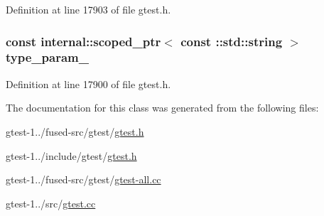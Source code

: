 \-Definition at line 17903 of file gtest.\-h.

\hypertarget{classtesting_1_1TestCase_a85fc352afd22204cc3515cb59a7d5b38}{
\subsubsection[{type\-\_\-param\-\_\-}]{\setlength{\rightskip}{0pt plus 5cm}const {\bf internal\-::scoped\-\_\-ptr}$<$ const \-::std\-::string $>$ {\bf type\-\_\-param\-\_\-}}}\label{d0/d9a/classtesting_1_1TestCase_a85fc352afd22204cc3515cb59a7d5b38}


\-Definition at line 17900 of file gtest.\-h.



\-The documentation for this class was generated from the following files\-:\begin{DoxyCompactItemize}
\item 
gtest-\/1../fused-\/src/gtest/\hyperlink{fused-src_2gtest_2gtest_8h}{gtest.\-h}\item 
gtest-\/1../include/gtest/\hyperlink{include_2gtest_2gtest_8h}{gtest.\-h}\item 
gtest-\/1../fused-\/src/gtest/\hyperlink{fused-src_2gtest_2gtest-all_8cc}{gtest-\/all.\-cc}\item 
gtest-\/1../src/\hyperlink{gtest_8cc}{gtest.\-cc}\end{DoxyCompactItemize}
